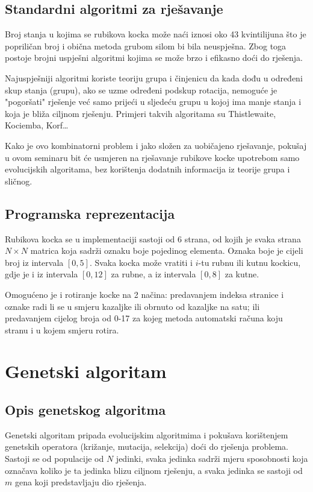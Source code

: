 \documentclass[times, utf8, seminar, numeric]{fer}
\begin{document}
\section{Standardni algoritmi za rješavanje}

Broj stanja u kojima se rubikova kocka može naći iznosi oko 43 kvintilijuna što je popriličan broj i obična metoda grubom silom bi bila neuspješna. Zbog toga postoje brojni uspješni algoritmi kojima se može brzo i efikasno doći do rješenja.

Najuspješniji algoritmi koriste teoriju grupa i činjenicu da kada dođu u određeni skup stanja (grupu), ako se uzme određeni podskup rotacija, nemoguće je "pogoršati" rješenje već samo prijeći u sljedeću grupu u kojoj ima manje stanja i koja je bliža ciljnom rješenju. Primjeri takvih algoritama su Thistlewaite, Kociemba, Korf\dots

Kako je ovo kombinatorni problem i jako složen za uobičajeno rješavanje, pokušaj u ovom seminaru bit će usmjeren na rješavanje rubikove kocke upotrebom samo evolucijskih algoritama, bez korištenja dodatnih informacija iz teorije grupa i sličnog.

\section{Programska reprezentacija}
Rubikova kocka se u implementaciji sastoji od 6 strana, od kojih je svaka strana $N\times N$ matrica koja sadrži oznaku boje pojedinog elementa. Oznaka boje je cijeli broj iz intervala $[0, 5]$. Svaka kocka može vratiti i $i$-tu rubnu ili kutnu kockicu, gdje je i iz intervala $[0, 12]$ za rubne, a iz intervala $[0, 8]$ za kutne. 

Omogućeno je i rotiranje kocke na 2 načina: predavanjem indeksa stranice i oznake radi li se u smjeru kazaljke ili obrnuto od kazaljke na satu; ili predavanjem cijelog broja od 0-17 za kojeg metoda automatski računa koju stranu i u kojem smjeru rotira.

\chapter{Genetski algoritam}

\section{Opis genetskog algoritma}
Genetski algoritam pripada evolucijskim algoritmima i pokušava korištenjem genetskih operatora (križanje, mutacija, selekcija) doći do rješenja problema. Sastoji se od populacije od $N$ jedinki, svaka jedinka sadrži mjeru sposobnosti  koja označava koliko je ta jedinka blizu ciljnom rješenju, a svaka jedinka se sastoji od $m$ gena koji predstavljaju dio rješenja. 
\end{document}
